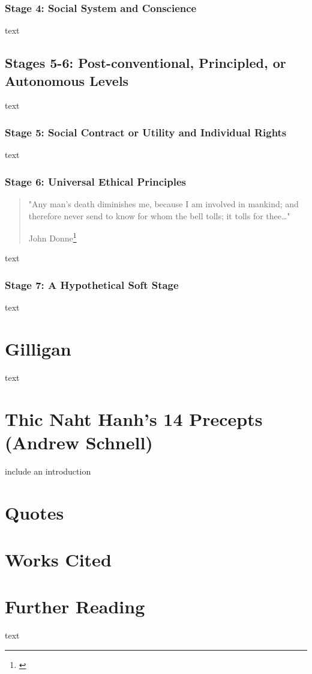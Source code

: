 \subsubsection{Stage 4: Social System and Conscience}

text

\subsection{Stages 5-6: Post-conventional, Principled, or Autonomous Levels}

text

\subsubsection{Stage 5: Social Contract or Utility and Individual Rights}

text

\subsubsection{Stage 6: Universal Ethical Principles}

\begin{quote}
"Any man's death diminishes me, because I am involved in mankind; and therefore never send to know for whom the bell tolls; it tolls for thee\ldots"
\begin{flushright}
John Donne\footnote{\cite{DONNE:1624}}
\end{flushright}
\end{quote}

text

\subsubsection{Stage 7: A Hypothetical Soft Stage}

text

\section{Gilligan}

text

\section{Thic Naht Hanh's 14 Precepts (Andrew Schnell)}

include an introduction

\section{Quotes}

\section{Works Cited}

\section{Further Reading}

text

